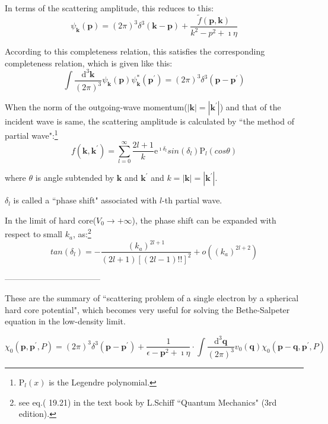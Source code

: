 In terms of the scattering amplitude, this reduces to this:
\begin{equation*} \label{Eqs2.7.A.7'} \tag{2.7.A.7'}
\psi_{\mathbf{k}} (\mathbf{p}) = (2\pi)^3 \delta^3(\mathbf{k}-\mathbf{p}) + \frac{\tilde{f}(\mathbf{p},\mathbf{k})}{k^2-p^2+\imath \eta}
\end{equation*}

According to this completeness relation, this satisfies the corresponding completeness relation, which is given like this:
\begin{equation*} \label{Eqs2.7.A.9} \tag{2.7.A.9}
\int \frac{\mathrm{d}^3 \mathbf{k}}{(2\pi)^3} \psi_{\mathbf{k}}(\mathbf{p}) \psi_{\mathbf{k}}^* (\mathbf{p}^{'}) = (2\pi) ^3 \delta^3 (\mathbf{p} - \mathbf{p}^{'})
\end{equation*}

When the norm of the outgoing-wave momentum($|\mathbf{k}| = |\mathbf{k}^{'}|$) and that of the incident wave is same, the scattering amplitude is calculated by ``the method of partial wave":\footnote{$\mathrm{P}_l(x)$ is the Legendre polynomial.}
\begin{equation*} \label{Eqs2.7.A.10} \tag{2.7.A.10}
f(\mathbf{k},\mathbf{k}^{'}) = \sum_{l=0}^{\infty} \frac{2l+1}{k} \mathrm{e}^{\imath \delta_l} sin(\delta_l) \mathrm{P}_l (cos\theta)
\end{equation*}

where $\theta$ is angle subtended by $\mathbf{k}$ and $\mathbf{k}^{'}$ and $k = |\mathbf{k}| = |\mathbf{k}^{'}|$.

$\delta_l$ is called a ``phase shift" associated with $l$-th partial wave.

In the limit of hard core($V_0 \rightarrow +\infty$), the phase shift can be expanded with respect to small $k_a$, as:\footnote{see eq.( 19.21) in the text book by L.Schiff ``Quantum Mechanics" (3rd edition).}
\begin{equation*} \label{Eqs2.7.A.11} \tag{2.7.A.11}
tan(\delta_l) = - \frac{(k_a)^{2l+1}}{(2l+1)[(2l-1)!!]^2} + o((k_a)^{2l+2})\end{equation*}

\begin{center}-----------------------------------\end{center}

These are the summary of ``scattering problem of a single electron by a spherical hard core potential", which becomes very useful for solving the Bethe-Salpeter equation in the low-density limit.

\begin{equation*}  \tag{2.7.18'}
\chi_0(\mathbf{p},\mathbf{p}^{'},P) = (2\pi)^3\delta^3(\mathbf{p}-\mathbf{p}^{'}) + \frac{1}{\epsilon-\mathbf{p}^2+\imath\eta}\cdot\int\frac{\mathrm{d}^3\mathbf{q}}{(2\pi)^3}v_0(\mathbf{q}) \chi_0(\mathbf{p}-\mathbf{q},\mathbf{p}^{'},P)
\end{equation*}

